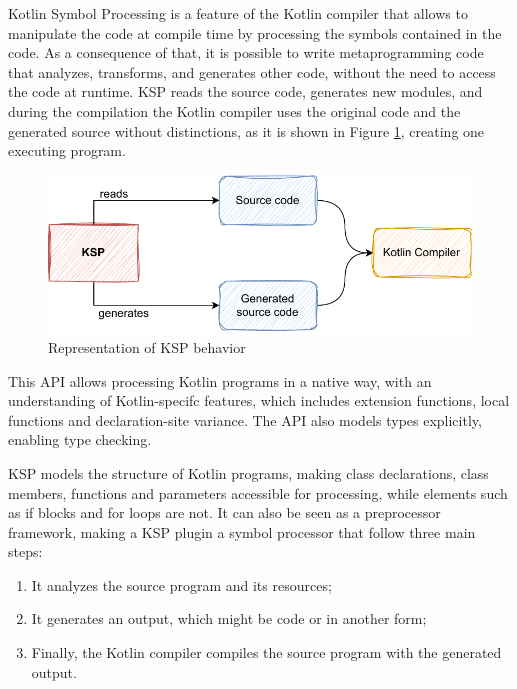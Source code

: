 Kotlin Symbol Processing is a feature of the Kotlin compiler that allows to manipulate the code at compile time by processing the symbols contained in the code. As a consequence of that, it is possible to write metaprogramming code that analyzes, transforms, and generates other code, without the need to access the code at runtime.\newline
KSP reads the source code, generates new modules, and during the compilation the Kotlin compiler uses the original code and the generated source without distinctions, as it is shown in Figure \ref{fig:ksp_diagram}, creating one executing program.

\begin{figure}[!ht]
    \centering
    \includegraphics[scale=1]{document/chapters/2-metaprogramming/images/ksp_diagram.pdf}
    \caption{Representation of KSP behavior}
    \label{fig:ksp_diagram}
\end{figure}

This API allows processing Kotlin programs in a native way, with an understanding of Kotlin-specifc features, which includes extension functions, local functions and declaration-site variance. The API also models types explicitly, enabling type checking.

KSP models the structure of Kotlin programs, making class declarations, class members, functions and parameters accessible for processing, while elements such as if blocks and for loops are not.\newline
It can also be seen as a preprocessor framework, making a KSP plugin a symbol processor that follow three main steps:
\begin{enumerate}
    \item It analyzes the source program and its resources;
    \item It generates an output, which might be code or in another form;
    \item Finally, the Kotlin compiler compiles the source program with the generated output.
\end{enumerate}

